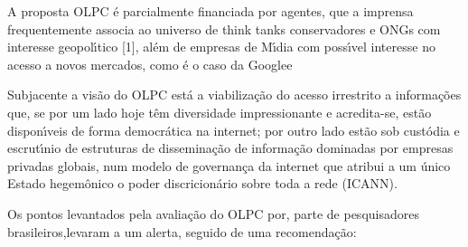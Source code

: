 \documentclass[
12pt,		%
openright,	%
twoside,  %
a4paper,			%
chapter=TITLE,		%
english,			%
french,				%
spanish,			%
brazil				%
]{USPSC-classe/USPSC}
\begin{document}
\begin{alineas}
\item \textquotedbl A proposta OLPC \'e parcialmente financiada por agentes, que a imprensa frequentemente associa ao universo de think tanks conservadores e ONGs com interesse geopol\'{\i}tico [1], al\'em de empresas de M\'{\i}dia com poss\'{\i}vel interesse no acesso a novos mercados, como \'e o caso da Google\textquotedbl  e
\item \textquotedbl Subjacente a vis\~ao do OLPC est\'a a viabiliza\c{c}\~ao do acesso irrestrito a informa\c{c}\~oes que, se por um lado hoje t\^em diversidade impressionante e acredita-se, est\~ao dispon\'{\i}veis de forma democr\'atica na internet; por outro lado est\~ao sob cust\'odia e escrut\'{\i}nio de estruturas de dissemina\c{c}\~ao de informa\c{c}\~ao dominadas por empresas privadas globais, num modelo de governan\c{c}a da internet que atribui a um \'unico Estado hegem\^onico o poder discricion\'ario sobre toda a rede (ICANN)\textquotedbl .
\end{alineas}

Os pontos levantados pela avalia\c{c}\~ao do OLPC por, parte de pesquisadores brasileiros,levaram a um alerta, seguido de uma recomenda\c{c}\~ao:


















\noindent\begin{center}\mbox{\centering{}}\end{center}
\end{document}
